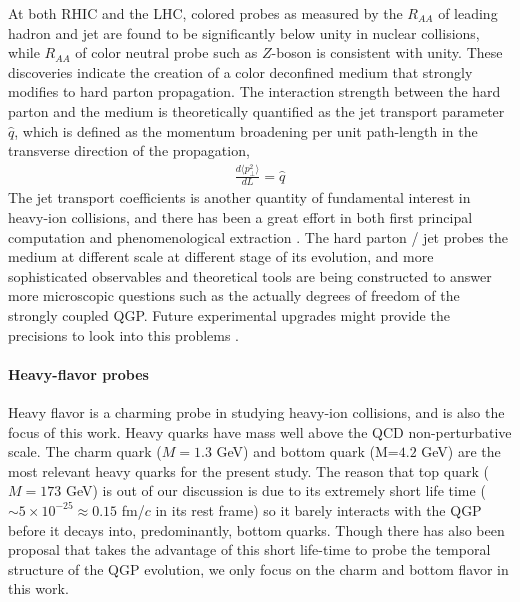 At both RHIC and the LHC, colored probes as measured by the $R_{AA}$ of leading hadron and jet are found to be significantly below unity in nuclear collisions, while  $R_{AA}$ of color neutral probe such as $Z$-boson is consistent with unity.
These discoveries indicate the creation of a color deconfined medium that strongly modifies to hard parton propagation.
The interaction strength between the hard parton and the medium is theoretically quantified as the jet transport parameter $\hat{q}$, which is defined as the momentum broadening per unit path-length in the transverse direction of the propagation,
\begin{eqnarray}
\frac{d\langle p_\perp^2 \rangle}{dL} = \hat{q}
\end{eqnarray}
The jet transport coefficients is another quantity of fundamental interest  in heavy-ion collisions, and there has been a great effort in both first principal computation and phenomenological extraction \cite{Wang:1994fx,Zakharov:1996fv,Baier:1996sk,Zakharov:1997uu,Arnold:2002zm,Gyulassy:2003mc,Kovner:2003zj,Jeon:2003gi,CasalderreySolana:2007pr,Djordjevic:2008iz,Bass:2008rv,Schenke:2009gb,Majumder:2009zu,Majumder:2010qh,Armesto:2011ht,Zapp:2011ya,Ovanesyan:2011xy,Kang:2014xsa,Cao:2016gvr,Kauder:2018cdt,Cao:2017zih}.
The hard parton / jet probes the medium at different scale at different stage of its evolution, and more sophisticated observables and theoretical tools are being constructed to answer more microscopic questions such as the actually degrees of freedom of the strongly coupled QGP.
Future experimental upgrades might provide the precisions to look into this problems \cite{ATLAS-Collaboration:2012iwa,Abelevetal:2014dna,STAR:upgrade-hf,Adare:2015kwa,CMS:2017dec}.

\paragraph{Heavy-flavor probes}
Heavy flavor is a charming probe in studying heavy-ion collisions, and is also the focus of this work.
Heavy quarks have mass well above the QCD non-perturbative scale.
The charm quark ($M=1.3$ GeV) and bottom quark (M=$4.2$ GeV) are the most relevant heavy quarks for the present study.
The reason that top quark ($M = 173$ GeV) is out of our discussion is due to its extremely short life time ($\sim 5\times 10^{-25} \approx 0.15$  fm/$c$ in its rest frame) so it barely interacts with the QGP before it decays into, predominantly, bottom quarks.
Though there has also been proposal that takes the advantage of this short life-time to probe the temporal structure of the QGP evolution, we only focus on the charm and bottom flavor in this work.

